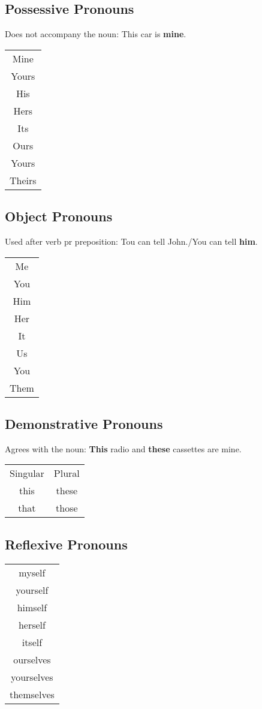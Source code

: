 \documentclass[a4paper, titlepage]{article}
\begin{document}
\subsection{Possessive Pronouns}

Does not accompany the noun: This car is \textbf{mine}.

\begin{tabular}{c}
Mine\\
Yours\\
His\\
Hers\\
Its\\
Ours\\
Yours\\
Theirs
\end{tabular}
\subsection{Object Pronouns}

Used after verb pr preposition: Tou can tell John./You can tell \textbf{him}.

\begin{tabular}{c}
Me \\
You\\
Him\\
Her\\
It\\
Us\\
You\\
Them
\end{tabular}

\subsection{Demonstrative Pronouns}
Agrees with the noun: \textbf{This} radio and \textbf{these} cassettes are mine.

\begin{tabular}{cc}
	Singular&Plural\\
	this&these\\
	that&those
\end{tabular}
\subsection{Reflexive Pronouns}
\begin{tabular}{c}
myself\\
yourself\\
himself\\
herself\\
itself\\
ourselves\\
yourselves\\
themselves
\end{tabular}
\end{document}
